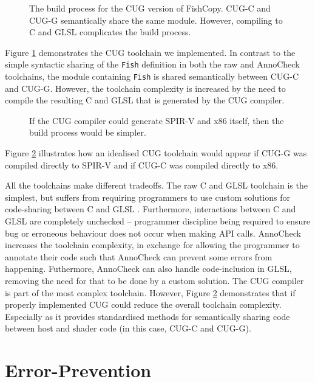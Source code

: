 \documentclass[a4paper,12pt,twoside,openright]{report}
\begin{document}
\begin{figure}[h]
\centering
\def\svgwidth{0.8\linewidth}

\caption{The build process for the CUG version of FishCopy. CUG-C and CUG-G
semantically share the same module. However, compiling to C and GLSL
complicates the build process.}
\label{fig:pipeline_cug}
\end{figure}

Figure \ref{fig:pipeline_cug} demonstrates the CUG toolchain we implemented. In
contrast to the simple syntactic sharing of the \texttt{Fish} definition in
both the raw and AnnoCheck toolchains, the module containing \texttt{Fish} is
shared semantically between CUG-C and CUG-G. However, the toolchain complexity
is increased by the need to compile the resulting C and GLSL that is generated
by the CUG compiler.

\begin{figure}[h]
\centering
\def\svgwidth{0.8\linewidth}

\caption{If the CUG compiler could generate SPIR-V and x86 itself, then the build
process would be simpler.}
\label{fig:pipeline_cug_future}
\end{figure}

Figure \ref{fig:pipeline_cug_future} illustrates how an idealised CUG toolchain
would appear if CUG-G was compiled directly to SPIR-V and if CUG-C was compiled
directly to x86.

All the toolchains make different tradeoffs. The raw C and GLSL toolchain is
the simplest, but suffers from requiring programmers to use custom solutions
for code-sharing between C and GLSL \cite{NoIncludeGLSL}. Furthermore,
interactions between C and GLSL are completely unchecked -- programmer
discipline being required to ensure bug or erroneous behaviour does not occur
when making API calls. AnnoCheck increases the toolchain complexity, in
exchange for allowing the programmer to annotate their code such that AnnoCheck
can prevent some errors from happening. Futhermore, AnnoCheck can also handle
code-inclusion in GLSL, removing the need for that to be done by a custom
solution. The CUG compiler is part of the most complex toolchain. However,
Figure \ref{fig:pipeline_cug_future} demonstrates that if properly implemented
CUG could reduce the overall toolchain complexity. Especially as it provides
standardised methods for semantically sharing code between host and shader code
(in this case, CUG-C and CUG-G).

\section{Error-Prevention}
\end{document}
